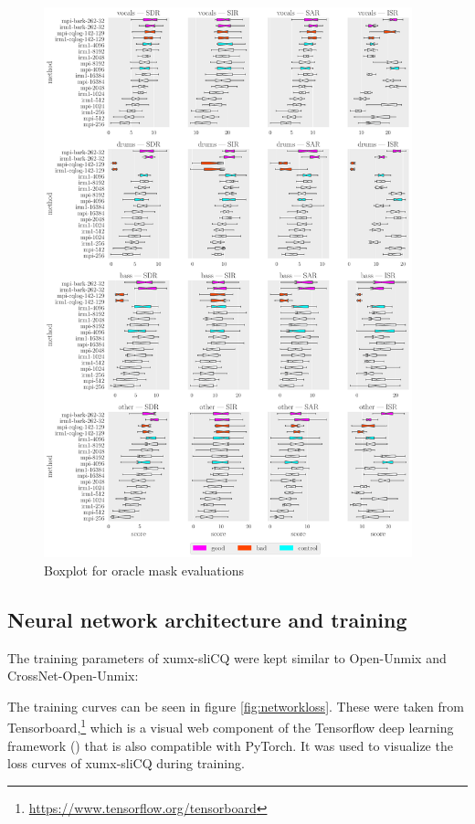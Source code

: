 \documentclass[report.tex]{subfiles}
\begin{document}
\begin{figure}[ht]
	\centering
	\includegraphics[width=0.95\textwidth]{./images-bss/oracle_boxplot.pdf}
	\caption{Boxplot for oracle mask evaluations}
	\label{fig:oraclebssboxplot}
\end{figure}

\newpagefill

\subsection{Neural network architecture and training}

The training parameters of xumx-sliCQ were kept similar to Open-Unmix and CrossNet-Open-Unmix:

The training curves can be seen in figure \ref{fig:networkloss}. These were taken from Tensorboard,\footnote{\url{https://www.tensorflow.org/tensorboard}} which is a visual web component of the Tensorflow deep learning framework (\cite{tensorflow, tensorflowsoft}) that is also compatible with PyTorch. It was used to visualize the loss curves of xumx-sliCQ during training.
\end{document}
